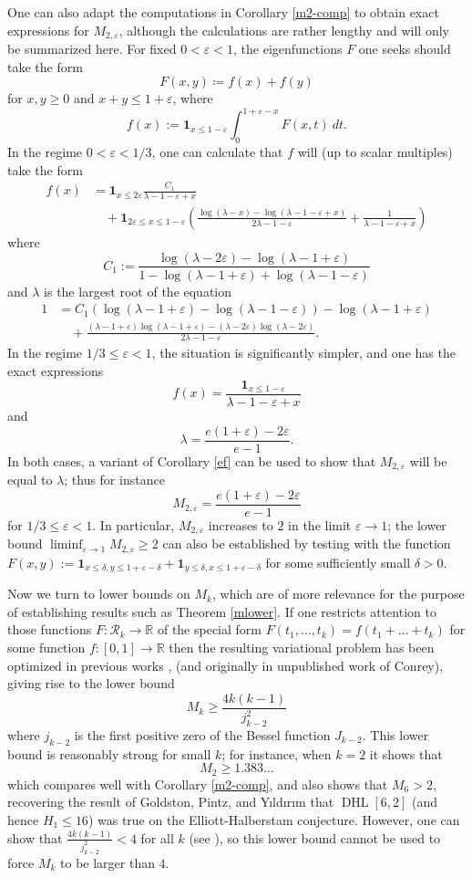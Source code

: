 \documentclass{bmcart}
\DeclareMathOperator*\DHL{DHL}
\theoremstyle{plain}
\theoremstyle{definition}
\newcommand\R{\mathbb{R}}
\newcommand\eps{\varepsilon}
\newcommand{\onef}{\mathbf{1}}
\begin{document}
One can also adapt the computations in Corollary \ref{m2-comp} to obtain exact expressions for $M_{2,\eps}$, although the calculations are rather lengthy and will only be summarized here.  For fixed $0 < \eps < 1$, the eigenfunctions $F$ one seeks should take the form
$$ F(x,y) \coloneqq f(x) + f(y)$$
for $x,y \geq 0$ and $x+y \leq 1+\eps$, where
$$ f(x) := \onef_{x \leq 1-\eps} \int_0^{1+\eps-x} F(x,t)\ dt.$$
In the regime $0 < \eps < 1/3$, one can calculate that $f$ will (up to scalar multiples) take the form
\begin{align*}
 f(x) &= \onef_{x \leq 2\eps} \frac{C_1}{\lambda-1-\eps+x} \\
&\quad + \onef_{2\eps \leq x \leq 1-\eps} \left(\frac{\log(\lambda-x)-\log(\lambda-1-\eps+x)}{2\lambda-1-\eps} + \frac{1}{\lambda-1-\eps+x} \right)
\end{align*}
where
$$ C_1 := \frac{\log(\lambda-2\eps) - \log(\lambda-1+\eps)}{1 - \log(\lambda-1+\eps) + \log(\lambda-1-\eps)} $$
and $\lambda$ is the largest root of the equation
\begin{align*}
 1 &= C_1 ( \log(\lambda-1+\eps) - \log(\lambda-1-\eps)) - \log(\lambda-1+\eps) \\
&\quad + \frac{ (\lambda-1+\eps) \log(\lambda-1+\eps) - (\lambda-2\eps) \log(\lambda-2\eps) }{2\lambda-1-\eps}.
\end{align*}
In the regime $1/3 \leq \eps < 1$, the situation is significantly simpler, and one has the exact expressions
$$ f(x) = \frac{\onef_{x \leq 1-\eps}}{\lambda - 1 - \eps + x}$$
and 
$$ \lambda = \frac{e(1+\eps)-2\eps}{e-1}.$$
In both cases, a variant of Corollary \ref{ef} can be used to show that $M_{2,\eps}$ will be equal to $\lambda$; thus for instance
$$ M_{2,\eps} = \frac{e(1+\eps)-2\eps}{e-1}$$
for $1/3 \leq \eps < 1$.  In particular, $M_{2,\eps}$ increases to $2$ in the limit $\eps \to 1$; the lower bound $\liminf_{\eps \to 1} M_{2,\eps} \geq 2$ can also be established by testing with the function $F(x,y) := \onef_{x \leq \delta, y \leq 1+\eps-\delta} + \onef_{y \leq \delta, x \leq 1+\eps-\delta}$ for some sufficiently small $\delta>0$.

Now we turn to lower bounds on $M_k$, which are of more relevance for the purpose of establishing results such as Theorem \ref{mlower}.  If one restricts attention to those functions $F: {\mathcal R}_k \to \R$ of the special form $F(t_1,\dots,t_k) = f(t_1+\dots+t_k)$ for some function $f: [0,1] \to \R$ then the resulting variational problem has been optimized in previous works \cite{revesz}, \cite{polymath8a-unabridged} (and originally in unpublished work of Conrey), giving rise to the lower bound
$$ M_k \geq \frac{4k(k-1)}{j_{k-2}^2}$$
where $j_{k-2}$ is the first positive zero of the Bessel function $J_{k-2}$.  This lower bound is reasonably strong for small $k$; for instance, when $k=2$ it shows that
$$ M_2 \geq 1.383\dots$$
which compares well with Corollary \ref{m2-comp}, and also shows that $M_6 > 2$, recovering the result of Goldston, Pintz, and Y{\i}ld{\i}r{\i}m that $\DHL[6,2]$ (and hence $H_1 \leq 16$) was true on the Elliott-Halberstam conjecture.  However, one can show that $\frac{4k(k-1)}{j_{k-2}^2} < 4$ for all $k$ (see \cite{sound}), so this lower bound cannot be used to force $M_k$ to be larger than $4$.
\end{document}
